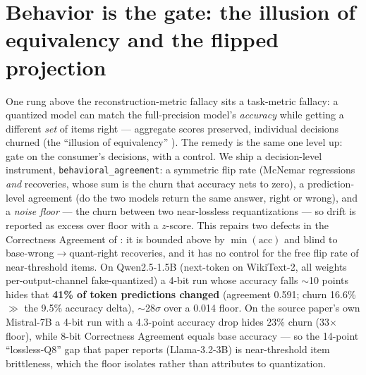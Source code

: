 \documentclass[11pt]{article}
\begin{document}
\section{Behavior is the gate: the illusion of equivalency and the flipped projection}\label{sec:behavioral}
One rung above the reconstruction-metric fallacy sits a task-metric fallacy: a
quantized model can match the full-precision model's \emph{accuracy} while
getting a different \emph{set} of items right --- aggregate scores preserved,
individual decisions churned (the ``illusion of equivalency'' \cite{illusion}).
The remedy is the same one level up: gate on the consumer's decisions, with a
control. We ship a decision-level instrument, \texttt{behavioral\_agreement}: a
symmetric flip rate (McNemar regressions \emph{and} recoveries, whose sum is
the churn that accuracy nets to zero), a prediction-level agreement (do the two
models return the same answer, right or wrong), and a \emph{noise floor} --- the
churn between two near-lossless requantizations --- so drift is reported as
excess over floor with a $z$-score. This repairs two defects in the Correctness
Agreement of \cite{illusion}: it is bounded above by $\min(\mathrm{acc})$ and
blind to base-wrong$\rightarrow$quant-right recoveries, and it has no control
for the free flip rate of near-threshold items. On Qwen2.5-1.5B (next-token on
WikiText-2, all weights per-output-channel fake-quantized) a 4-bit run whose
accuracy falls $\sim$10 points hides that \textbf{41\% of token predictions
changed} (agreement 0.591; churn 16.6\% $\gg$ the 9.5\% accuracy delta),
$\sim$28$\sigma$ over a 0.014 floor. On the source paper's own Mistral-7B a
4-bit run with a 4.3-point accuracy drop hides 23\% churn (33$\times$ floor),
while 8-bit Correctness Agreement equals base accuracy --- so the 14-point
``lossless-Q8'' gap that paper reports (Llama-3.2-3B) is near-threshold item
brittleness, which the floor isolates rather than attributes to quantization.
\end{document}
